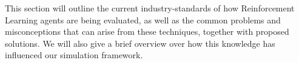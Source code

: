 \begin{jointwork}
	This section will outline the current industry-standards of how Reinforcement Learning agents are being evaluated, as well as the common problems and misconceptions that can arise from these techniques, together with proposed solutions. We will also give a brief overview over how this knowledge has influenced our simulation framework.
\end{jointwork}